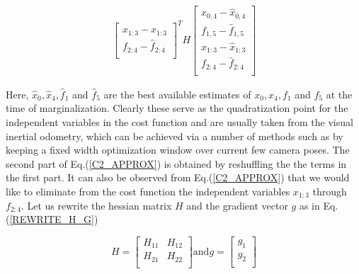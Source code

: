 \begin{equation}
\begin{split}
\begin{bmatrix}
																								x_{1:3} - \hat x_{1:3}\\ 
                                                f_{2:4} - \hat f_{2:4}\\
									              \end{bmatrix}^T H 
												\begin{bmatrix} x_{0,4} - \hat x_{0,4}\\ 
                                        f_{1,5} - \hat f_{1,5}\\
																				x_{1:3} - \hat x_{1:3}\\ 
                                        f_{2:4} - \hat f_{2:4}\\
									      \end{bmatrix} 
\label{C2_APPROX}
\end{split}
\end{equation}

Here, $\hat x_0, \hat x_4, \hat f_1$ and $\hat f_5$ are the best available estimates of $x_0, x_4, f_1$ and $f_5$ at the time of marginalization. Clearly these serve as the quadratization point for the independent variables in the cost function and are usually taken from the visual inertial odometry, which can be achieved via a number of methods such as by keeping a fixed width optimization window over current few camera poses. The second part of Eq.(\ref{C2_APPROX}) is obtained by reshuffling the the terms in the first part. It can also be observed from Eq.(\ref{C2_APPROX}) that we would like to eliminate from the cost function the independent variables $x_{1:3}$ through $f_{2:4}$. Let us rewrite the hessian matrix $H$ and the gradient vector $g$ as in Eq.(\ref{REWRITE_H_G})

\begin{subequations}
\begin{equation}
H = \begin{bmatrix} 
			H_{11} & H_{12} \\
			H_{21} & H_{22} \\
		\end{bmatrix} 
\end{equation}
\text{and}

\begin{equation}
g = \begin{bmatrix} 
			g_{1} \\
			g_{2} \\
		\end{bmatrix}
\end{equation}
\label{REWRITE_H_G}
\end{subequations}

